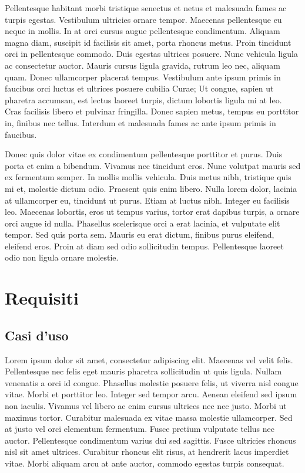 \documentclass[11pt,fleqn]{book} %
\begin{document}
Pellentesque habitant morbi tristique senectus et netus et malesuada fames ac turpis egestas. Vestibulum ultricies ornare tempor. Maecenas pellentesque eu neque in mollis. In at orci cursus augue pellentesque condimentum. Aliquam magna diam, suscipit id facilisis sit amet, porta rhoncus metus. Proin tincidunt orci in pellentesque commodo. Duis egestas ultrices posuere. Nunc vehicula ligula ac consectetur auctor. Mauris cursus ligula gravida, rutrum leo nec, aliquam quam. Donec ullamcorper placerat tempus. Vestibulum ante ipsum primis in faucibus orci luctus et ultrices posuere cubilia Curae; Ut congue, sapien ut pharetra accumsan, est lectus laoreet turpis, dictum lobortis ligula mi at leo. Cras facilisis libero et pulvinar fringilla. Donec sapien metus, tempus eu porttitor in, finibus nec tellus. Interdum et malesuada fames ac ante ipsum primis in faucibus.

Donec quis dolor vitae ex condimentum pellentesque porttitor et purus. Duis porta et enim a bibendum. Vivamus nec tincidunt eros. Nunc volutpat mauris sed ex fermentum semper. In mollis mollis vehicula. Duis metus nibh, tristique quis mi et, molestie dictum odio. Praesent quis enim libero. Nulla lorem dolor, lacinia at ullamcorper eu, tincidunt ut purus. Etiam at luctus nibh. Integer eu facilisis leo. Maecenas lobortis, eros ut tempus varius, tortor erat dapibus turpis, a ornare orci augue id nulla. Phasellus scelerisque orci a erat lacinia, et vulputate elit tempor. Sed quis porta sem. Mauris eu erat dictum, finibus purus eleifend, eleifend eros. Proin at diam sed odio sollicitudin tempus. Pellentesque laoreet odio non ligula ornare molestie.




\chapter{Requisiti}

\section{Casi d'uso}
Lorem ipsum dolor sit amet, consectetur adipiscing elit. Maecenas vel velit felis. Pellentesque nec felis eget mauris pharetra sollicitudin ut quis ligula. Nullam venenatis a orci id congue. Phasellus molestie posuere felis, ut viverra nisl congue vitae. Morbi et porttitor leo. Integer sed tempor arcu. Aenean eleifend sed ipsum non iaculis. Vivamus vel libero ac enim cursus ultrices nec nec justo. Morbi ut maximus tortor. Curabitur malesuada ex vitae massa molestie ullamcorper. Sed at justo vel orci elementum fermentum. Fusce pretium vulputate tellus nec auctor. Pellentesque condimentum varius dui sed sagittis. Fusce ultricies rhoncus nisl sit amet ultrices. Curabitur rhoncus elit risus, at hendrerit lacus imperdiet vitae. Morbi aliquam arcu at ante auctor, commodo egestas turpis consequat.
\end{document}
